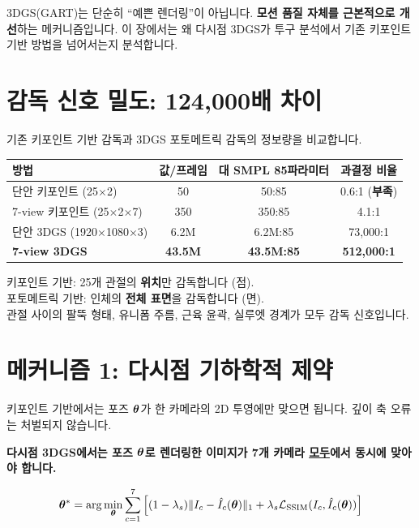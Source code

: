 \documentclass[11pt, a4paper]{report}
\begin{document}
3DGS(GART)는 단순히 ``예쁜 렌더링''이 아닙니다. \textbf{모션 품질 자체를 근본적으로 개선}하는 메커니즘입니다. 이 장에서는 왜 다시점 3DGS가 투구 분석에서 기존 키포인트 기반 방법을 넘어서는지 분석합니다.

\section{감독 신호 밀도: 124,000배 차이}

기존 키포인트 기반 감독과 3DGS 포토메트릭 감독의 정보량을 비교합니다.

\begin{center}
\renewcommand{\arraystretch}{1.3}
\begin{tabular}{lccc}
\toprule
\textbf{방법} & \textbf{값/프레임} & \textbf{대 SMPL 85파라미터} & \textbf{과결정 비율} \\
\midrule
단안 키포인트 (25$\times$2) & 50 & 50:85 & 0.6:1 (\textbf{부족}) \\
7-view 키포인트 (25$\times$2$\times$7) & 350 & 350:85 & 4.1:1 \\
단안 3DGS (1920$\times$1080$\times$3) & 6.2M & 6.2M:85 & 73,000:1 \\
\textbf{7-view 3DGS} & \textbf{43.5M} & \textbf{43.5M:85} & \textbf{512,000:1} \\
\bottomrule
\end{tabular}
\end{center}

\begin{keyidea}
키포인트 기반: 25개 관절의 \textbf{위치}만 감독합니다 (점).\\
포토메트릭 기반: 인체의 \textbf{전체 표면}을 감독합니다 (면).\\
관절 사이의 팔뚝 형태, 유니폼 주름, 근육 윤곽, 실루엣 경계가 모두 감독 신호입니다.
\end{keyidea}


\section{메커니즘 1: 다시점 기하학적 제약}

키포인트 기반에서는 포즈 $\bm{\theta}$가 한 카메라의 2D 투영에만 맞으면 됩니다. 깊이 축 오류는 처벌되지 않습니다.

\textbf{다시점 3DGS에서는 포즈 $\bm{\theta}$로 렌더링한 이미지가 7개 카메라 \underline{모두}에서 동시에 맞아야 합니다.}

\begin{equation}
\bm{\theta}^* = \arg\min_{\bm{\theta}} \sum_{c=1}^{7} \Big[ (1-\lambda_s)\|I_c - \hat{I}_c(\bm{\theta})\|_1 + \lambda_s \mathcal{L}_{\text{SSIM}}(I_c, \hat{I}_c(\bm{\theta})) \Big]
\end{equation}
\end{document}
